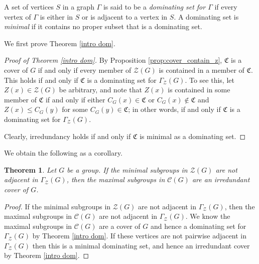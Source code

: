 \documentclass[12pt]{amsart}
\newtheorem{theorem}{Theorem}[section]
\begin{document}
{A set of vertices $S$ in a graph $\Gamma$ is said to be a \textit{dominating set for $\Gamma$} if every vertex of $\Gamma$ is either in $S$ or is adjacent to a vertex in $S$.  A dominating set is \textit{minimal} if it contains no proper subset that is a dominating set.

We first prove Theorem \ref{intro dom}.


\begin{proof}[Proof of Theorem \ref{intro dom}]
By Proposition \ref{prop:cover_contain_z}, $\mathfrak{C}$ is a cover of $G$ if and only if every member of $\mathcal{Z}(G)$ is contained in a member of $\mathfrak{C}$.  This holds if and only if $\mathfrak{C}$ is a dominating set for $\Gamma_{\mathcal Z} (G)$.  To see this, let $Z(x) \in \mathcal{Z}(G)$ be arbitrary, and note that $Z(x)$ is contained in some member of $\mathfrak{C}$ if and only if either $C_G(x) \in \mathfrak{C}$ or $C_G(x) \notin \mathfrak{C}$ and $Z(x) \leq C_G(y)$ for some $C_G(y) \in \mathfrak{C}$; in other words, if and only if $\mathfrak{C}$ is a dominating set for $\Gamma_{\mathcal Z} (G)$.

Clearly, irredundancy holds if and only if $\mathfrak{C}$ is minimal as a dominating set.
%
\end{proof}

We obtain the following as a corollary.

\begin{theorem} \label{not adj}
Let $G$ be a group.  If the minimal subgroups in $\mathcal {Z} (G)$ are not adjacent in $\Gamma_{\mathcal Z} (G)$, then the maximal subgroups in $\mathcal {C} (G)$ are an irredundant cover of $G$.
\end{theorem}

\begin{proof}
If the minimal subgroups in $\mathcal{Z}(G)$ are not adjacent in $\Gamma_{\mathcal{Z}}(G)$, then the maximal subgroups in $\mathcal{C}(G)$ are not adjacent in $\Gamma_{\mathcal{Z}}(G)$.  We know the maximal subgroups in $\mathcal{C}(G)$ are a cover of $G$ and hence a dominating set for $\Gamma_{\mathcal{Z}}(G)$ by Theorem \ref{intro dom}.  If these vertices are not pairwise adjacent in $\Gamma_{\mathcal{Z}}(G)$ then this is a minimal dominating set, and hence an irredundant cover by Theorem \ref{intro dom}.
\end{proof}

}
\end{document}
